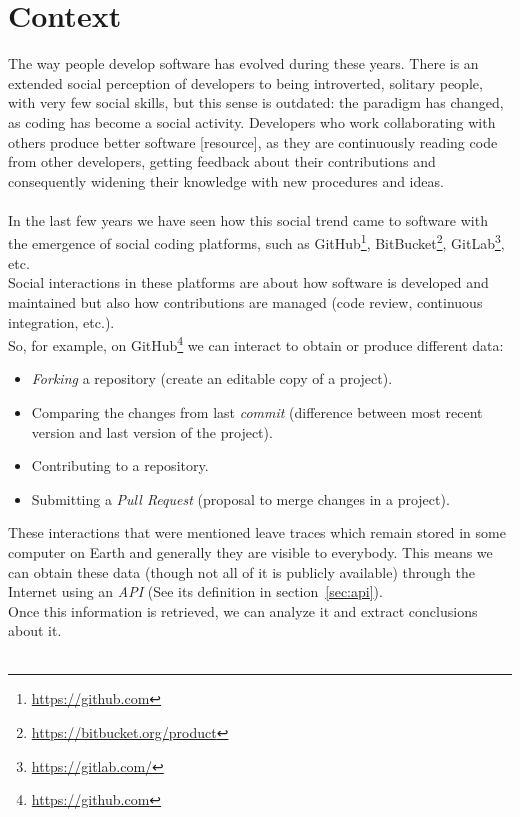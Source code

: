 \documentclass[a4paper, 12pt]{book}
\begin{document}
\section{Context}
\label{sec:context}
The way people develop software has evolved during these years. There is an extended social perception of developers to
being introverted, solitary people, with very few social skills, but this sense is outdated: the paradigm has changed,
as coding has become a social activity. Developers who work collaborating with others produce better software [resource], as they
are continuously reading code from other developers, getting feedback about their contributions and consequently
widening their knowledge with new procedures and ideas.\\\\
In the last few years we have seen how this social trend came to software with the
emergence of social coding platforms, such as GitHub\footnote{\url{https://github.com}},
BitBucket\footnote{\url{https://bitbucket.org/product}}, GitLab\footnote{\url{https://gitlab.com/}}, etc.\\
Social interactions in these platforms are about how software is developed and maintained but also how
contributions are managed (code review, continuous integration, etc.).\\
So, for example, on GitHub\footnote{\url{https://github.com}} we can interact to obtain or produce different data:
\begin{itemize}
    \item \textit{Forking} a repository (create an editable copy of a project).
    \item Comparing the changes from last \textit{commit} (difference between most recent version and last version of the project).
    \item Contributing to a repository.
    \item Submitting a \textit{Pull Request} (proposal to merge changes in a project).
\end{itemize}
These interactions that were mentioned leave traces which remain stored in some computer on Earth and generally
they are visible to everybody.
This means we can obtain these data (though not all of it is publicly available) through the Internet using an \emph{API}
(See its definition in section~\ref{sec:api}).\\
Once this information is retrieved, we can analyze it and extract conclusions about it.\\\\
\end{document}
